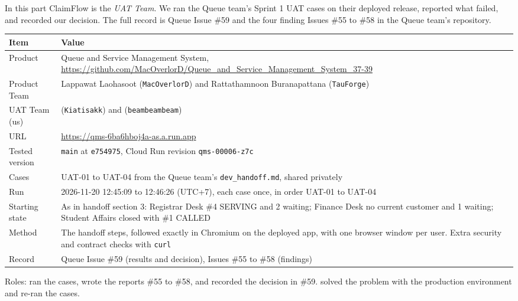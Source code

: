 In this part ClaimFlow is the \emph{UAT Team}. We ran the Queue team's Sprint 1 UAT cases on their deployed release, reported what failed, and recorded our decision.
The full record is Queue Issue \#59 and the four finding Issues \#55 to \#58 in the Queue team's repository.


\begin{longtable}{@{}R{3.6cm}R{12.4cm}@{}}
\toprule \textbf{Item} & \textbf{Value} \\ \midrule \endhead
Product & Queue and Service Management System, \url{https://github.com/MacOverlorD/Queue_and_Service_Management_System_37-39} \\
Product Team & Lappawat Laohasoot (\texttt{MacOverlorD}) and Rattathamnoon Buranapattana (\texttt{TauForge}) \\
UAT Team (us) & \studentOneName{} (\texttt{Kiatisakk}) and \studentTwoName{} (\texttt{beambeambeam}) \\
URL & \url{https://qms-6ba6hboj4a-as.a.run.app} \\
Tested version & \texttt{main} at \texttt{e754975}, Cloud Run revision \texttt{qms-00006-z7c} \\
Cases & UAT-01 to UAT-04 from the Queue team's \texttt{dev\_handoff.md}, shared privately \\
Run & 2026-11-20 12:45:09 to 12:46:26 (UTC+7), each case once, in order UAT-01 to UAT-04 \\
Starting state & As in handoff section 3: Registrar Desk \#4 SERVING and 2 waiting; Finance Desk no current customer and 1 waiting; Student Affairs closed with \#1 CALLED \\
Method & The handoff steps, followed exactly in Chromium on the deployed app, with one browser window per user. Extra security and contract checks with \texttt{curl} \\
Record & Queue Issue \#59 (results and decision), Issues \#55 to \#58 (findings) \\
\bottomrule
\end{longtable}

Roles: \studentTwoName{} ran the cases, wrote the reports \#55 to \#58, and recorded the decision in \#59. \studentOneName{} solved the problem with the production environment and re-ran the cases.


